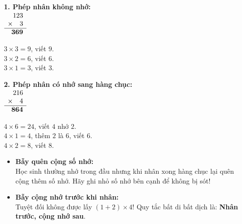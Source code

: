 \documentclass[11pt,a4paper]{article}
\begin{document}
\vspace{-2.5mm}
\noindent
\begin{minipage}[t]{0.49\textwidth}\vspace{0pt}
\begin{tcolorbox}[
  enhanced,
  colback=green!4!white,
  colframe=green!60!black,
  arc=2mm, boxrule=0.8pt,
  left=2mm, right=2mm, top=1.8mm, bottom=1.8mm,
  title={\footnotesize\bfseries\color{white}\faCheckCircle\ Ví dụ thực hành chuẩn mực}
]
{\footnotesize
\textbf{1. Phép nhân không nhớ:}\\
$\begin{array}{r@{}l}
  123 & \\
  \times\quad 3 & \\
  \hline
  \mathbf{369} &
\end{array}$
\qquad
\begin{minipage}[c]{0.55\linewidth}
$3 \times 3 = 9$, viết $9$.\\
$3 \times 2 = 6$, viết $6$.\\
$3 \times 1 = 3$, viết $3$.
\end{minipage}

\textbf{2. Phép nhân có nhớ sang hàng chục:}\\
$\begin{array}{r@{}l}
  216 & \\
  \times\quad 4 & \\
  \hline
  \mathbf{864} &
\end{array}$
\qquad
\begin{minipage}[c]{0.55\linewidth}
$4 \times 6 = 24$, viết $4$ nhớ $2$.\\
$4 \times 1 = 4$, thêm $2$ là $6$, viết $6$.\\
$4 \times 2 = 8$, viết $8$.
\end{minipage}
}
\end{tcolorbox}
\end{minipage}
\hfill
\begin{minipage}[t]{0.49\textwidth}\vspace{0pt}
\begin{tcolorbox}[
  enhanced,
  colback=red!4!white,
  colframe=red!70!black,
  arc=2mm, boxrule=0.8pt,
  left=2mm, right=2mm, top=1.8mm, bottom=1.8mm,
  title={\footnotesize\bfseries\color{white}\faExclamationTriangle\ Mẹo tránh bẫy trắc nghiệm}
]
{\footnotesize
\begin{itemize}\setlength{\itemsep}{1.5pt}\setlength{\leftskip}{-2.5mm}
  \item \textbf{Bẫy quên cộng số nhớ:}\\
  Học sinh thường nhớ trong đầu nhưng khi nhân xong hàng chục lại quên cộng thêm số nhớ. Hãy ghi nhỏ số nhớ bên cạnh để không bị sót!
  \item \textbf{Bẫy cộng nhớ trước khi nhân:}\\
  Tuyệt đối không được lấy $(1 + 2) \times 4$! Quy tắc bất di bất dịch là: \textbf{Nhân trước, cộng nhớ sau}.
\end{itemize}
}
\end{tcolorbox}
\end{minipage}
\end{document}
